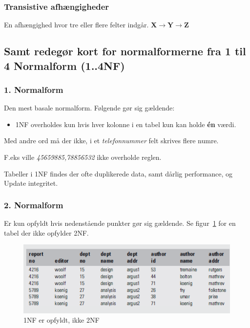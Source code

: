 \subsubsection{Transistive afhængigheder}
En afhængighed hvor tre eller flere felter indgår.
\textbf{X$\rightarrow$Y$\rightarrow$Z}


\subsection{Samt redegør kort for normalformerne fra 1 til 4 Normalform (1..4NF)}

\subsubsection{1. Normalform}
Den mest basale normalform. Følgende gør sig gældende:

\begin{itemize}
	\item 1NF overholdes kun hvis hver kolonne i en tabel kun kan holde \textbf{én} værdi. 
\end{itemize}

Med andre ord må der ikke, i et \textit{telefonnummer} felt skrives flere numre. 

F.eks ville \textit{45659885,78856532} ikke overholde reglen.


Tabeller i 1NF findes der ofte duplikerede data, samt dårlig performance, og Update integritet.
	
\subsubsection{2. Normalform}
Er kun opfyldt hvis nedenstående punkter gør sig gældende. Se figur~\ref{fig:not2NF} for en tabel der ikke opfylder 2NF.
	
\begin{figure}[H]
	\centering
	\includegraphics[width=0.8\linewidth]{figs/spm5/not2NF.PNG}
	\caption{1NF er opfyldt, ikke 2NF}
	\label{fig:not2NF}
\end{figure}
	

